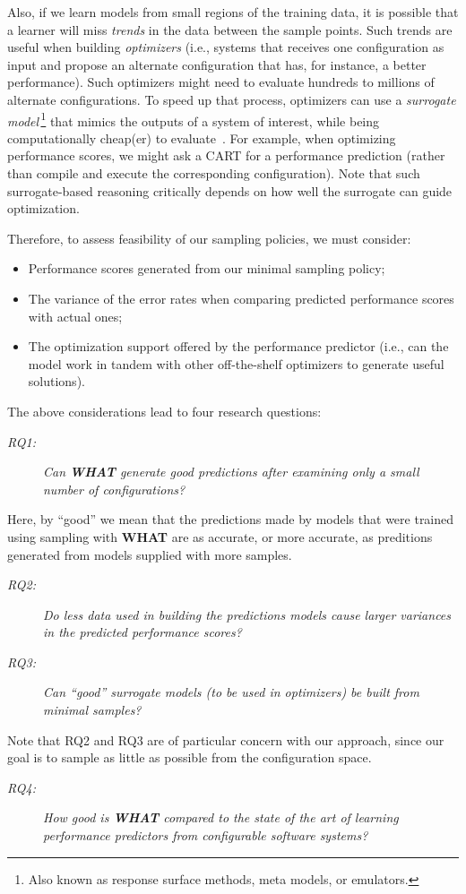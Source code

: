 \documentclass[smallextended]{svjour3}       %
\newcommand{\what}{{\bf WHAT}\xspace}
\begin{document}
Also, if we learn models from small regions of the training data,
it is  possible that a learner will miss {\em trends} in the data
between the sample points. Such trends are useful when building {\em optimizers}
(i.e., systems that receives one configuration as input and propose an alternate
configuration that has, for instance,  a better performance). Such optimizers might
need to evaluate hundreds to millions of alternate configurations. 
To speed up that process, optimizers can use a {\em surrogate model}\,\footnote{Also known as response surface methods, meta models, or emulators.}
that  mimics the outputs of a system of interest, while being computationally cheap(er) to evaluate~\cite{loshchilov13}. For example, when optimizing
performance scores, we might ask a CART  for a performance
prediction (rather than compile and execute
the corresponding configuration).  Note that such surrogate-based
reasoning critically depends on how well the surrogate can guide optimization.


Therefore, to assess feasibility of our sampling policies, we must consider:
\begin{itemize}
\item Performance scores generated from our minimal sampling policy;
\item The variance of the error rates when comparing predicted performance scores with actual ones;
\item The optimization support offered by the performance predictor (i.e., can the model work in tandem with other off-the-shelf optimizers to generate useful solutions).
\end{itemize}

The above considerations lead to four research questions:
\begin{description}
\item[{\em RQ1:}] {\em Can  \what generate good predictions after
examining only a small number of configurations?}
\end{description}
Here, by ``good'' we mean that the predictions made by models that were trained using sampling with \what are as accurate, or more accurate,
as preditions generated from models supplied with more samples.
\begin{description}
\item[{\em RQ2:}] {\em
Do less data used in building the predictions models cause larger variances in the predicted performance scores?}
\item[{\em RQ3:}] {\em
Can ``good'' surrogate models (to be used in optimizers)
be built from minimal samples?}
\end{description}
Note that RQ2 and RQ3 are of particular concern with our approach,
since our goal is to sample as little as possible from the configuration space.
\begin{description}
\item[{\em RQ4:}] {\em How good is \what compared to the state of the art of
learning performance predictors from configurable software systems?}
\end{description}
\end{document}
